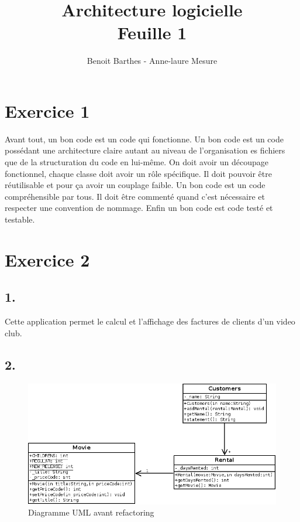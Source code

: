 \documentclass[%
a4paper,
11pt
]{article}
\begin{document}
\title{Architecture logicielle \\ Feuille 1}
\author{Benoit Barthes - Anne-laure Mesure}
\maketitle

\section*{Exercice 1}
Avant tout, un bon code est un code qui fonctionne.
Un bon code est un code possédant une architecture claire autant au niveau de l'organisation es fichiers que de la structuration du code en lui-même. On doit avoir un découpage fonctionnel, chaque classe doit avoir un rôle spécifique. Il doit pouvoir être réutilisable et pour ça avoir un couplage faible.
Un bon code est un code compréhensible par tous. Il doit être commenté quand c'est nécessaire et respecter une convention de nommage.
Enfin un bon code est code testé et testable.

\section*{Exercice 2}
\subsection*{1.}
Cette application permet le calcul et l'affichage des factures de clients d'un video club.
\newpage

\subsection*{2.}
\begin{figure}[!ht]
    \center
    \includegraphics[width = \textwidth]{imgs/Diagramme1.png}
    \caption{Diagramme UML avant refactoring}
\end{figure}
\end{document}
